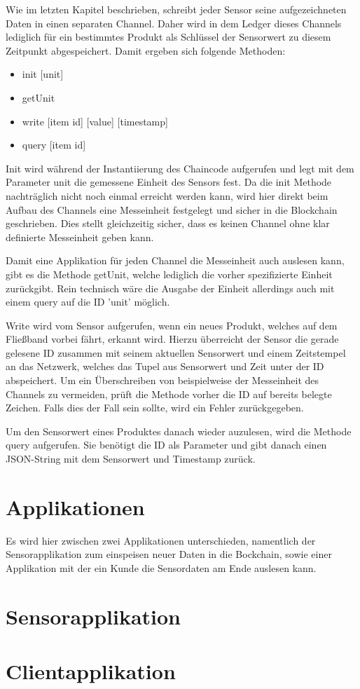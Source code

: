 Wie im letzten Kapitel beschrieben, schreibt jeder Sensor seine aufgezeichneten Daten in einen separaten Channel. Daher wird in dem Ledger dieses Channels lediglich für ein bestimmtes Produkt als Schlüssel der Sensorwert zu diesem Zeitpunkt abgespeichert. Damit ergeben sich folgende Methoden:
\begin{itemize}
    \item init [unit]
    \item getUnit
    \item write [item id] [value] [timestamp]
    \item query [item id]
\end{itemize}{}

Init wird während der Instantiierung des Chaincode aufgerufen und legt mit dem Parameter unit die gemessene Einheit des Sensors fest. Da die init Methode nachträglich nicht noch einmal erreicht werden kann, wird hier direkt beim Aufbau des Channels eine Messeinheit festgelegt und sicher in die Blockchain geschrieben. Dies stellt gleichzeitig sicher, dass es keinen Channel ohne klar definierte Messeinheit geben kann.

Damit eine Applikation für jeden Channel die Messeinheit auch auslesen kann, gibt es die Methode getUnit, welche lediglich die vorher spezifizierte Einheit zurückgibt. Rein technisch wäre die Ausgabe der Einheit allerdings auch mit einem query auf die ID 'unit' möglich.

Write wird vom Sensor aufgerufen, wenn ein neues Produkt, welches auf dem Fließband vorbei fährt, erkannt wird. Hierzu überreicht der Sensor die gerade gelesene ID zusammen mit seinem aktuellen Sensorwert und einem Zeitstempel an das Netzwerk, welches das Tupel aus Sensorwert und Zeit unter der ID abspeichert. Um ein Überschreiben von beispielweise der Messeinheit des Channels zu vermeiden, prüft die Methode vorher die ID auf bereits belegte Zeichen. Falls dies der Fall sein sollte, wird ein Fehler zurückgegeben.

Um den Sensorwert eines Produktes danach wieder auzulesen, wird die Methode query aufgerufen. Sie benötigt die ID als Parameter und gibt danach einen JSON-String mit dem Sensorwert und Timestamp zurück.

\section{Applikationen}
Es wird hier zwischen zwei Applikationen unterschieden, namentlich der Sensorapplikation zum einspeisen neuer Daten in die Bockchain, sowie einer Applikation mit der ein Kunde die Sensordaten am Ende auslesen kann.

\section{Sensorapplikation}

\section{Clientapplikation}
